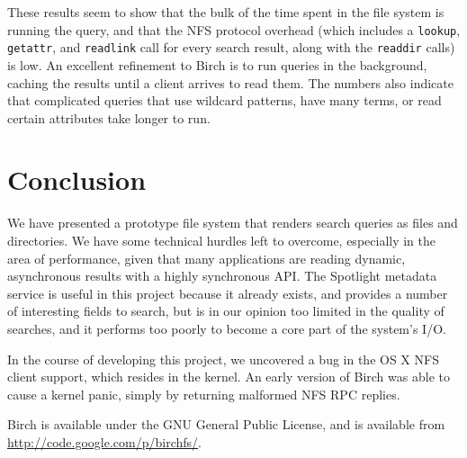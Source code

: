 \documentclass{article}
\begin{document}
These results seem to show that the bulk of the time spent in the file
system is running the query, and that the NFS protocol overhead (which
includes a \texttt{lookup}, \texttt{getattr}, and \texttt{readlink}
call for every search result, along with the \texttt{readdir} calls)
is low. An excellent refinement to Birch is to run queries in the
background, caching the results until a client arrives to read
them. The numbers also indicate that complicated queries that use
wildcard patterns, have many terms, or read certain attributes take
longer to run.

\section{Conclusion}

We have presented a prototype file system that renders search queries
as files and directories. We have some technical hurdles left to
overcome, especially in the area of performance, given that many
applications are reading dynamic, asynchronous results with a highly
synchronous API. The Spotlight metadata service is useful in this
project because it already exists, and provides a number of
interesting fields to search, but is in our opinion too limited in the
quality of searches, and it performs too poorly to become a core part
of the system's I/O.

In the course of developing this project, we uncovered a bug in the OS
X NFS client support, which resides in the kernel. An early version of
Birch was able to cause a kernel panic, simply by returning malformed
NFS RPC replies.

Birch is available under the GNU General Public License, and is
available from \url{http://code.google.com/p/birchfs/}.



\vfill
\begin{center}
\end{center}
\vfill
\end{document}
